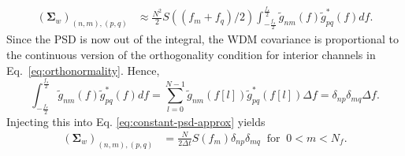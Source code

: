 \begin{align}
\label{eq:constant-psd-approx}
(\boldsymbol{\Sigma}_w)_{(n,m),(p,q)} & \approx \frac{N^2}{2} S\left((f_m + f_q) / 2\right)\int_{-\frac{f_s}{2}}^{\frac{f_s}{2}} \tilde{g}_{nm}(f) \tilde{g}_{pq}^{*}(f) df.
\end{align}
Since the PSD is now out of the integral, the WDM covariance is proportional to the continuous version of the orthogonality condition for interior channels in Eq.~\eqref{eq:orthonormality}.
Hence,
\begin{equation}
    \int_{-\frac{f_s}{2}}^{\frac{f_s}{2}} \tilde{g}_{nm}(f) \tilde{g}_{pq}^{*}(f) df 
    = \sum_{l=0}^{N-1}  \tilde{g}_{nm}(f[l]) \tilde{g}_{pq}^{*}(f[l]) \Delta f = \delta_{np} \delta_{mq} \Delta f.
\end{equation}
Injecting this into Eq. \eqref{eq:constant-psd-approx} yields
\begin{align}
\label{eq:wdm-covariance-stationary}
(\boldsymbol{\Sigma}_w)_{(n,m),(p,q)} & = \frac{N}{2\Delta t} S(f_m) \delta_{np} \delta_{mq} \;\;\text{for}\;\; 0<m<N_f.
\end{align}